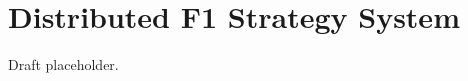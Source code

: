 \documentclass{article}
\begin{document}
\section*{Distributed F1 Strategy System}
Draft placeholder.
\end{document}
